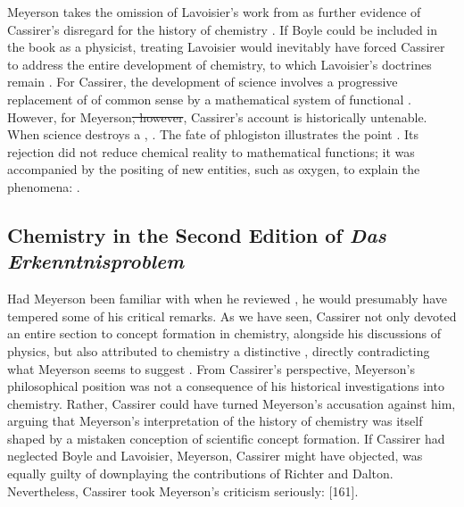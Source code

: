 \documentclass[submitted,12pt]{article}
\providecommand{\DIFdel}[1]{{\protect\color{red}\sout{#1}}}                      %
\providecommand{\DIFdelbegin}{} %
\providecommand{\DIFdelend}{} %
\begin{document}
Meyerson takes the omission of Lavoisier's work from \EPt as further evidence of Cassirer's disregard for the history of chemistry \citep[103]{Meyerson1911}.  If Boyle could be included in the book as a physicist, treating Lavoisier would inevitably have forced Cassirer to address the entire development of chemistry, to which Lavoisier's doctrines remain  \citep[103]{Meyerson1911}. For Cassirer, the development of science involves a progressive replacement of  of common sense by a mathematical system of functional . However, for Meyerson\DIFdelbegin \DIFdel{, however}\DIFdelend , Cassirer's account is historically untenable. When science destroys a ,   \citep[129]{Meyerson1911}. The fate of phlogiston illustrates the point \citep[see][203]{Meyerson1908}. Its rejection did not reduce chemical reality to mathematical functions; it was accompanied by the positing of new entities, such as oxygen, to explain the phenomena:  \citep[129]{Meyerson1911}. 

\subsection{Chemistry in the Second Edition of \emph{Das Erkenntnisproblem}}
%
Had Meyerson been familiar with \SFt when he reviewed \EPt, he would presumably have tempered some of his critical remarks. As we have seen, Cassirer not only devoted an entire section to concept formation in chemistry, alongside his discussions of physics, but also attributed to chemistry a distinctive , directly contradicting what Meyerson seems to suggest . From Cassirer's perspective, Meyerson's philosophical position was not a consequence of his historical investigations into chemistry. Rather, Cassirer could have turned Meyerson's accusation against him, arguing that Meyerson's interpretation of the history of chemistry was itself shaped by a mistaken conception of scientific concept formation. If Cassirer had neglected Boyle and Lavoisier, Meyerson, Cassirer might have objected, was equally guilty of downplaying the contributions of Richter and Dalton. Nevertheless, Cassirer took Meyerson's criticism seriously:  [161].
\end{document}
